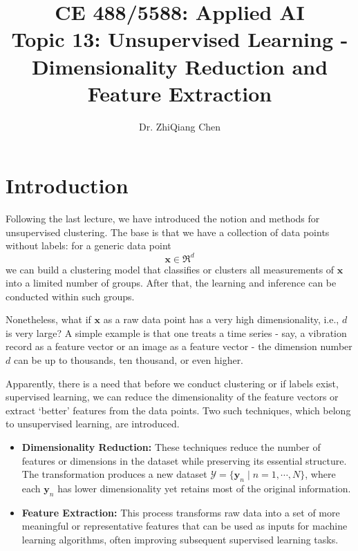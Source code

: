 \documentclass[12pt]{article}
\begin{document}
\doublespacing	

\title{CE 488/5588: Applied AI\\ \large Topic 13: Unsupervised Learning - Dimensionality Reduction and Feature Extraction}
\author{Dr. ZhiQiang Chen}
\date{}
\maketitle

\section{Introduction}

Following the last lecture, we have introduced the notion and methods for unsupervised clustering. The base is that we have a collection of data points without labels: for a generic data point
\[
\bm{x} \in \Re^d
\]
we can build a clustering model that classifies or clusters all measurements of $\bm{x}$ into a limited number of groups.  After that, the learning and inference can be conducted within such groups.

Nonetheless, what if $\bm{x}$ as a raw data point has a very high dimensionality, i.e., $d$ is very large? A simple example is that one treats a time series - say, a vibration record as a feature vector or an image as a feature vector - the dimension number $d$ can be up to thousands, ten thousand, or even higher. 

Apparently, there is a need that before we conduct clustering or if labels exist, supervised learning, we can reduce the dimensionality of the feature vectors or extract `better' features from the data points. Two such techniques, which belong to unsupervised learning, are introduced. 
\begin{itemize}
     \item \textbf{Dimensionality Reduction:} These techniques reduce the number of features or dimensions in the dataset while preserving its essential structure. The transformation produces a new dataset \(\mathcal{Y} = \{ \bm{y}_n \mid n = 1, \cdots, N\}\), where each \(\bm{y}_n\) has lower dimensionality yet retains most of the original information.
    \item \textbf{Feature Extraction:} This process transforms raw data into a set of more meaningful or representative features that can be used as inputs for machine learning algorithms, often improving subsequent supervised learning tasks.
\end{itemize}
\end{document}
